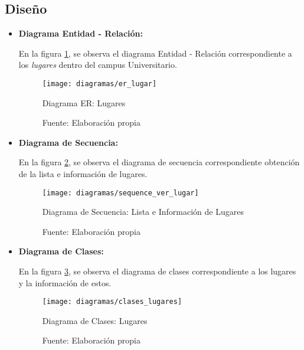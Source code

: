 
\subsection{Diseño}


\begin{itemize}
  \item \textbf{Diagrama Entidad - Relación:}

En la figura \ref{fig:er_lugar}, se observa el diagrama Entidad - Relación correspondiente a los \emph{lugares} dentro del campus Universitario.

\begin{figure}[H]
  \begin{center}
    \texttt{[image: diagramas/er\_lugar]}
  \end{center}
  \caption{Diagrama ER: Lugares}
  \label{fig:er_lugar}
  \caption*{Fuente: Elaboración propia}
\end{figure}



\item \textbf{Diagrama de Secuencia:}

En la figura \ref{fig:sequence_ver_lugar}, se observa el diagrama de secuencia correspondiente obtención de la lista e información de lugares.


\begin{figure}[H]
  \begin{center}
    \texttt{[image: diagramas/sequence\_ver\_lugar]}
  \end{center}
  \caption{Diagrama de Secuencia: Lista e Información de Lugares}
  \label{fig:sequence_ver_lugar}
  \caption*{Fuente: Elaboración propia}
\end{figure}



\item \textbf{Diagrama de Clases:}


En la figura \ref{fig:clases_lugares}, se observa el diagrama de clases correspondiente a los lugares y la información de estos.

\begin{figure}[H]
\begin{center}
  \texttt{[image: diagramas/clases\_lugares]}
\end{center}
\caption{Diagrama de Clases: Lugares}
\label{fig:clases_lugares}
\caption*{Fuente: Elaboración propia}
\end{figure}


\end{itemize}
